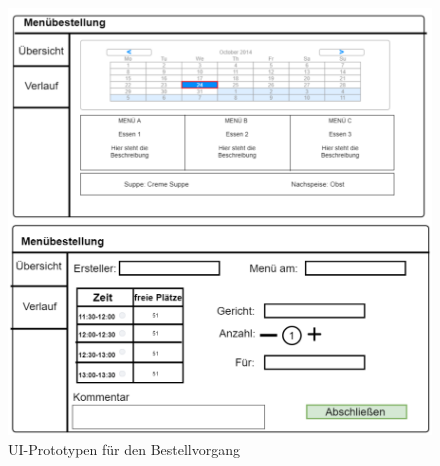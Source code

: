 \begin{figure}[htp]
    \author{Benjamin Besic}
    \centering
    \includegraphics[scale=0.3]{pics/UI-Bestellung-Prototyp.png}
    \caption{UI-Prototypen für den Bestellvorgang}
    \label{fig:impl:UIPlanningBest}
\end{figure}

